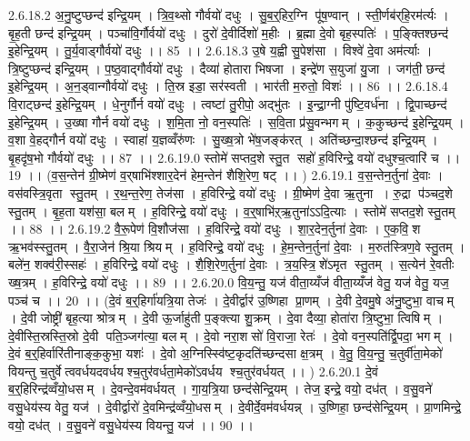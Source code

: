 2.6.18.2
अ॒नु॒ष्टुप्छन्द॑ इन्द्रि॒यम् । त्रि॒व॒थ्सो गौर्वयो॑ दधुः । सु॒ब॒र्॒हिर॒ग्नि पू॑ष॒ण्वान् । स्ती॒र्णब॑र्‌हि॒रम॑र्त्यः । बृ॒ह॒ती छन्द॑ इन्द्रि॒यम् । पञ्चा॑वि॒र्गौर्वयो॑ दधुः । दुरो॑ दे॒वीर्दिशो॑ म॒हीः । ब्र॒ह्मा दे॒वो बृह॒स्पतिः॑ । प॒ङ्क्तिश्छन्द॑ इ॒हेन्द्रि॒यम् । तु॒र्य॒वाड्गौर्वयो॑ दधुः ।। 85 ।।
2.6.18.3
उ॒षे य॒ह्वी सु॒पेश॑सा । विश्वे॑ दे॒वा अम॑र्त्याः । त्रि॒ष्टुप्छन्द॑ इन्द्रि॒यम् । प॒ष्ठ॒वाद्गौर्वयो॑ दधुः । दैव्या॑ होतारा भिषजा । इन्द्रे॑ण स॒युजा॑ यु॒जा । जग॑ती॒ छन्द॑ इ॒हेन्द्रि॒यम् । अ॒न॒ड्वान्गौर्वयो॑ दधुः । ति॒स्र इडा॒ सर॑स्वती । भार॑ती म॒रुतो॒ विशः॑ ।। 86 ।।
2.6.18.4
वि॒राट्छन्द॑ इ॒हेन्द्रि॒यम् । धे॒नुर्गौर्न वयो॑ दधुः । त्वष्टा॑ तु॒रीपो॒ अद्भु॑तः । इ॒न्द्रा॒ग्नी पु॑ष्टि॒वर्ध॑ना । द्वि॒पाच्छन्द॑ इ॒हेन्द्रि॒यम् । उ॒ख्षा गौर्न वयो॑ दधुः । श॒मि॒ता नो॒ वन॒स्पतिः॑ । स॒वि॒ता प्र॑सु॒वन्भगम् । क॒कुच्छन्द॑ इ॒हेन्द्रि॒यम् । व॒शा वे॒हद्गौर्न वयो॑ दधुः । स्वाहा॑ य॒ज्ञव्वँरु॑णः । सु॒ख्ष॒त्रो भे॑ष॒जङ्क॑रत् । अति॑च्छन्दा॒श्छन्द॑ इन्द्रि॒यम् । बृ॒हदृ॑ष॒भो गौर्वयो॑ दधुः ।। 87 ।।
2.6.19.0
स्तोमे॑ सप्तद॒शे स्तु॒त सहो॑ ह॒विरिन्द्रे॒ वयो॑ दधुश्च॒त्वारि॑ च ।। 19 ।। (व॒स॒न्तेन॑ ग्री॒ष्मेण॑ व॒र्‌षाभि॑श्शार॒देन॑ हेम॒न्तेन॑ शैशि॒रेण॒ षट् ।। )
2.6.19.1
व॒स॒न्तेन॒र्तुना॑ दे॒वाः । वस॑वस्त्रि॒वृता स्तु॒तम् । र॒थ॒न्त॒रेण॒ तेज॑सा । ह॒विरिन्द्रे॒ वयो॑ दधुः । ग्री॒ष्मेण॑ दे॒वा ऋ॒तुना । रु॒द्रा प॑ञ्चद॒शे स्तु॒तम् । बृ॒ह॒ता यश॑सा॒ बलम् । ह॒विरिन्द्रे॒ वयो॑ दधुः । व॒र्॒षाभि॑ऱ्ऋ॒तुना॑ऽऽदि॒त्याः । स्तोमे॑ सप्तद॒शे स्तु॒तम् ।। 88 ।।
2.6.19.2
वै॒रू॒पेण॑ वि॒शौज॑सा । ह॒विरिन्द्रे॒ वयो॑ दधुः । शा॒र॒देन॒र्तुना॑ दे॒वाः । ए॒क॒वि॒॒श ऋ॒भव॑स्स्तु॒तम् । वै॒रा॒जेन॑ श्रि॒या श्रियम् । ह॒विरिन्द्रे॒ वयो॑ दधुः । हे॒म॒न्तेन॒र्तुना॑ दे॒वाः । म॒रुत॑स्त्रिण॒वे स्तु॒तम् । बले॑न॒ शक्व॑री॒स्सहः॑ । ह॒विरिन्द्रे॒ वयो॑ दधुः । शै॒शि॒रेण॒र्तुना॑ दे॒वाः । त्र॒य॒स्त्रि॒॒शे॑ऽमृत॑ स्तु॒तम् । स॒त्येन॑ रे॒वतीः ख्ष॒त्रम् । ह॒विरिन्द्रे॒ वयो॑ दधुः ।। 89 ।।
2.6.20.0
वि॒य॒न्तु॒ यज॑ वीता॒य्यँज॑ वीता॒य्यँज॑ वेतु॒ यज॑ वेतु॒ यज॒ पञ्च॑ च ।। 20 ।। (दे॒वं ब॒र्॒हिर्गा॑यत्रि॒या तेजः॑ । दे॒वीर्द्वार॑ उ॒ष्णिहा प्रा॒णम् । दे॒वी दे॒वमु॒षे अ॑नु॒ष्टुभा॒ वाचम् । दे॒वी जोष्ट्री॑ बृह॒त्या श्रोत्रम् । दे॒वी ऊ॒र्जाहु॑ती प॒ङ्क्त्या शु॒क्रम् । दे॒वा दैव्या॒ होता॑रा त्रि॒ष्टुभा॒ त्विषिम् । दे॒वीस्ति॒स्रस्ति॒स्रो दे॒वी पति॒ञ्जग॑त्या॒ बलम् । दे॒वो नरा॒शसो॑ वि॒राजा॒ रेतः॑ । दे॒वो वन॒स्पति॑र्द्वि॒पदा॒ भगम् । दे॒वं ब॒र्॒हिर्वारि॑तीनाङ्क॒कुभा॒ यशः॑ । दे॒वो अ॒ग्निस्स्वि॑ष्ट॒कृदति॑च्छन्दसा क्ष॒त्रम् । वे॒तु॒ वि॒य॒न्तु॒ च॒तुर्वी॑ता॒मेको॑ वियन्तु च॒तुर्वेत्ववर्धयदवर्धयश्च॒तुर॑वर्धता॒मेको॑ऽवर्धय श्च॒तुर॑वर्धयत् ।। )
2.6.20.1
दे॒वं ब॒र्॒हिरिन्द्र॑व्वँयो॒धसम् । दे॒वन्दे॒वम॑वर्धयत् । गा॒य॒त्रि॒या छन्द॑सेन्द्रि॒यम् । तेज॒ इन्द्रे॒ वयो॒ दध॑त् । व॒सु॒वने॑ वसु॒धेय॑स्य वेतु॒ यज॑ । दे॒वीर्द्वारो॑ दे॒वमिन्द्र॑व्वँयो॒धसम् । दे॒वीर्दे॒वम॑वर्धयन्न् । उ॒ष्णिहा॒ छन्द॑सेन्द्रि॒यम् । प्रा॒णमिन्द्रे॒ वयो॒ दध॑त् । व॒सु॒वने॑ वसु॒धेय॑स्य वियन्तु॒ यज॑ ।। 90 ।।
